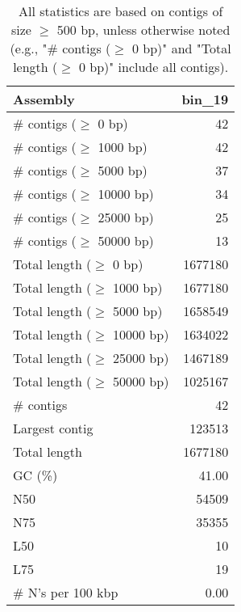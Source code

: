 \documentclass[12pt,a4paper]{article}
\begin{document}
\begin{table}[ht]
\begin{center}
\caption{All statistics are based on contigs of size $\geq$ 500 bp, unless otherwise noted (e.g., "\# contigs ($\geq$ 0 bp)" and "Total length ($\geq$ 0 bp)" include all contigs).}
\begin{tabular}{|l*{1}{|r}|}
\hline
Assembly & bin\_19 \\ \hline
\# contigs ($\geq$ 0 bp) & 42 \\ \hline
\# contigs ($\geq$ 1000 bp) & 42 \\ \hline
\# contigs ($\geq$ 5000 bp) & 37 \\ \hline
\# contigs ($\geq$ 10000 bp) & 34 \\ \hline
\# contigs ($\geq$ 25000 bp) & 25 \\ \hline
\# contigs ($\geq$ 50000 bp) & 13 \\ \hline
Total length ($\geq$ 0 bp) & 1677180 \\ \hline
Total length ($\geq$ 1000 bp) & 1677180 \\ \hline
Total length ($\geq$ 5000 bp) & 1658549 \\ \hline
Total length ($\geq$ 10000 bp) & 1634022 \\ \hline
Total length ($\geq$ 25000 bp) & 1467189 \\ \hline
Total length ($\geq$ 50000 bp) & 1025167 \\ \hline
\# contigs & 42 \\ \hline
Largest contig & 123513 \\ \hline
Total length & 1677180 \\ \hline
GC (\%) & 41.00 \\ \hline
N50 & 54509 \\ \hline
N75 & 35355 \\ \hline
L50 & 10 \\ \hline
L75 & 19 \\ \hline
\# N's per 100 kbp & 0.00 \\ \hline
\end{tabular}
\end{center}
\end{table}
\end{document}
